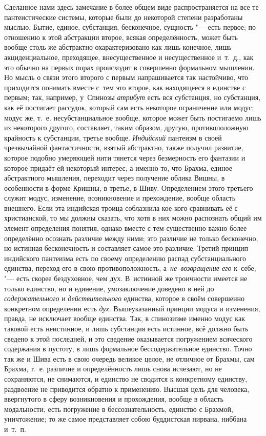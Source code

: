 Сделанное нами здесь замечание в более общем виде распространяется на все те
пантеистические системы, которые были до некоторой степени разработаны мыслью.
Бытие, единое, субстанция, бесконечное, сущность "--- есть первое; по отношению
к этой абстракции второе, всякая определённость, может быть вообще столь же
абстрактно охарактеризовано как лишь конечное, лишь акциденциальное,
преходящее, внесущественное и несущественное и~т.~д., как это обычно на первых
порах происходит в совершенно формальном мышлении. Но мысль о связи этого
второго с первым напрашивается так настойчиво, что приходится понимать вместе
с~тем это второе, как находящееся в единстве с первым; так, например, у~Спинозы
{\em атрибут} есть вся субстанция, но субстанция, как её постигает рассудок,
который сам есть некоторое ограничение или модус; модус же, т.~е.
несубстанциальное вообще, которое может быть постигаемо лишь из некоторого
другого, составляет, таким образом, другую, противоположную крайность к
субстанции, третье вообще. {\em Индийский} пантеизм в своей чрезвычайной
фантастичности, взятый абстрактно, также получил развитие, которое подобно
умеряющей нити тянется через безмерность его фантазии и которое придаёт ей
некоторый интерес, а именно то, что Брахма, единое абстрактного мышления,
переходит через получение облика Вишны, в особенности в форме Кришны, в третье,
в Шиву. Определением этого третьего служит модус, изменение, возникновение и
прехождение, вообще область внешнего. Если эта индийская троица соблазнила
кое-кого сравнивать её с христианской, то мы должны сказать, что хотя в них
можно распознать общий им элемент определения понятия, однако вместе с тем
существенно важно более определённо осознать различие между ними; это различие
не только бесконечно, но истинная бесконечность и составляет самое это
различие. Третий принцип индийского пантеизма есть по своему определению распад
субстанциального единства, переход его в свою противоположность,
а~{\em не~возвращение его} к~себе, "--- есть скорее бездуховное, чем дух.
В~истинной же троичности имеется не только единство, но и единение,
умозаключение доведено в ней до {\em содержательного} и {\em действительного}
единства, которое в своём совершенно конкретном определении есть {\em дух}.
Вышеуказанный принцип модуса и изменения, правда, не исключает вообще единства.
Так, в спинозизме именно модус как таковой есть неистинное, и лишь субстанция
есть истинное, всё должно быть сведено к этой последней, и это сведение
оказывается погружением всяческого содержания в пустоту, в лишь формальное
бессодержательное единство. Точно так же и Шива есть в свою очередь великое
целое, не отличное от Брахмы, сам Брахма, т.~е. различие и определённость лишь
снова исчезают, но не сохраняются, не снимаются, и единство не сводится к
конкретному единству, раздвоение не приводится обратно к применению. Высшая
цель для человека, ввергнутого в сферу возникновения и прохождения, вообще в
область модальности, есть погружение в бессознательность, единство с Брахмой,
уничтожение; то же самое представляет собою буддистская нирвана, ниббана
и~т.~п.

